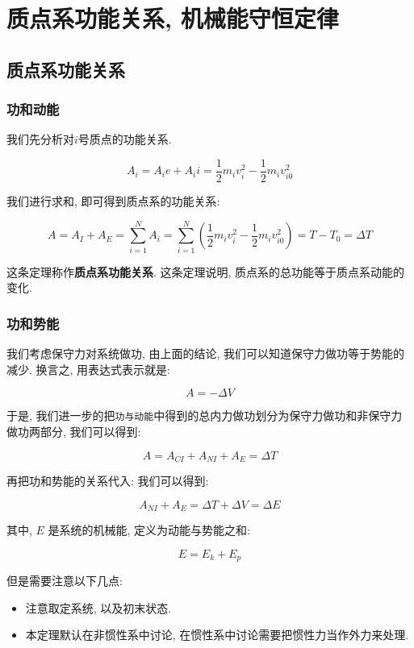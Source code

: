 \documentclass[
  a4paper,
]{ctexrep}
\providecommand{\tightlist}{%
  \setlength{\itemsep}{0pt}\setlength{\parskip}{0pt}}
\begin{document}
\section{质点系功能关系,
机械能守恒定律}\label{ux8d28ux70b9ux7cfbux529fux80fdux5173ux7cfb-ux673aux68b0ux80fdux5b88ux6052ux5b9aux5f8b}

\subsection{质点系功能关系}\label{ux8d28ux70b9ux7cfbux529fux80fdux5173ux7cfb}

\subsubsection{功和动能}\label{ux529fux548cux52a8ux80fd}

我们先分析对\(i\)号质点的功能关系.

\[
A_i = A_ie + A_ii = \frac{1}{2} m_i v_i^2 - \frac{1}{2} m_i v_{i0}^2
\]

我们进行求和, 即可得到质点系的功能关系:

\[
A = A_I + A_E = \sum_{i=1}^N A_i = \sum_{i=1}^N \left( \frac{1}{2} m_i v_i^2 - \frac{1}{2} m_i v_{i0}^2 \right) = T - T_0 = \Delta T
\]

这条定理称作\textbf{质点系功能关系}. 这条定理说明,
质点系的总功能等于质点系动能的变化.

\subsubsection{功和势能}\label{ux529fux548cux52bfux80fd}

我们考虑保守力对系统做功, 由上面的结论,
我们可以知道保守力做功等于势能的减少. 换言之, 用表达式表示就是:

\[
A = -\Delta V
\]

于是,
我们进一步的把\texttt{功与动能}中得到的总内力做功划分为保守力做功和非保守力做功两部分,
我们可以得到:

\[
A = A_{CI} + A_{NI} + A_E = \Delta T
\]

再把功和势能的关系代入: 我们可以得到:

\[A_{NI} + A_E = \Delta T + \Delta V = \Delta E\]

其中, \(E\) 是系统的机械能, 定义为动能与势能之和:

\[
E = E_k + E_p
\]

但是需要注意以下几点:

\begin{itemize}
\tightlist
\item
  注意取定系统, 以及初末状态.
\item
  本定理默认在非惯性系中讨论, 在惯性系中讨论需要把惯性力当作外力来处理.
\end{itemize}
\end{document}
